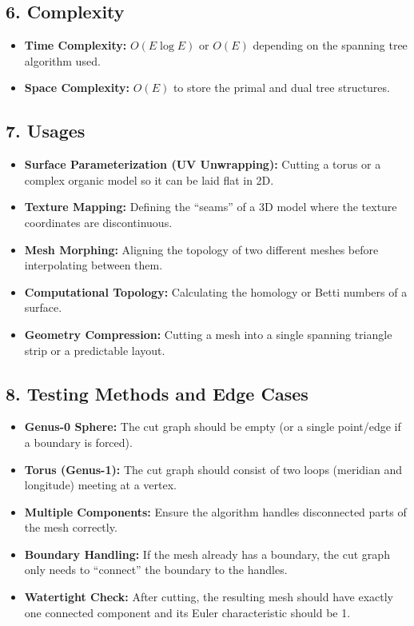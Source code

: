 \subsection{6. Complexity}

\begin{itemize}
    \item \textbf{Time Complexity:} $O(E \log E)$ or $O(E)$ depending on the spanning tree algorithm used.
    \item \textbf{Space Complexity:} $O(E)$ to store the primal and dual tree structures.
\end{itemize}

\subsection{7. Usages}

\begin{itemize}
    \item \textbf{Surface Parameterization (UV Unwrapping):} Cutting a torus or a complex organic model so it can be laid flat in 2D.
    \item \textbf{Texture Mapping:} Defining the ``seams'' of a 3D model where the texture coordinates are discontinuous.
    \item \textbf{Mesh Morphing:} Aligning the topology of two different meshes before interpolating between them.
    \item \textbf{Computational Topology:} Calculating the homology or Betti numbers of a surface.
    \item \textbf{Geometry Compression:} Cutting a mesh into a single spanning triangle strip or a predictable layout.
\end{itemize}

\subsection{8. Testing Methods and Edge Cases}

\begin{itemize}
    \item \textbf{Genus-0 Sphere:} The cut graph should be empty (or a single point/edge if a boundary is forced).
    \item \textbf{Torus (Genus-1):} The cut graph should consist of two loops (meridian and longitude) meeting at a vertex.
    \item \textbf{Multiple Components:} Ensure the algorithm handles disconnected parts of the mesh correctly.
    \item \textbf{Boundary Handling:} If the mesh already has a boundary, the cut graph only needs to ``connect'' the boundary to the handles.
    \item \textbf{Watertight Check:} After cutting, the resulting mesh should have exactly one connected component and its Euler characteristic should be 1.
\end{itemize}

